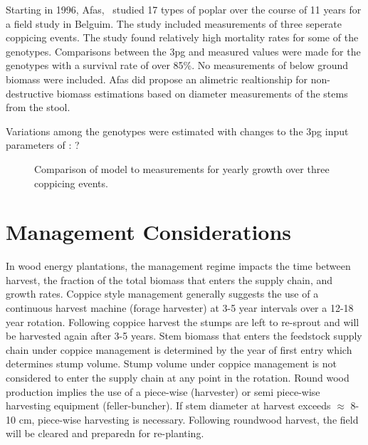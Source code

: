\documentclass[10pt]{article}
\begin{document}
Starting in 1996, Afas,~\cite{Afas2008a} studied 17 types of poplar
over the course of 11 years for a field study in Belguim.  The study
included measurements of three seperate coppicing events.  The study
found relatively high mortality rates for some of the genotypes.
Comparisons between the \ac{3pg} and measured values were made for the
genotypes with a survival rate of over 85\%.  No measurements of below
ground biomass were included.  Afas did propose an alimetric
realtionship for non-destructive biomass estimations based on diameter
measurements of the stems from the stool.

Variations among the genotypes were estimated with changes to the \ac{3pg}
input parameters of : ?

\begin{table}[!ht]
  \centering
    
  \caption{\ac{3pg} parameter variations of \ac{3pg} among genotypes}
  \label{tab:afas-3pg}
\end{table}

\begin{figure}[!ht]
  \centering

  \caption{Comparison of model to measurements for yearly growth over three
    coppicing events.}
\label{fig:afas-biomass}
\end{figure}

\section*{Management Considerations}
\label{sec:management-reg}

In wood energy plantations, the management regime impacts the time
between harvest, the fraction of the total biomass that enters the
supply chain, and growth rates. Coppice style management generally
suggests the use of a continuous harvest machine (forage harvester) at
3-5 year intervals over a 12-18 year rotation. Following coppice
harvest the stumps are left to re-sprout and will be harvested again
after 3-5 years.  Stem biomass that enters the feedstock supply chain
under coppice management is determined by the year of first entry
which determines stump volume.  Stump volume under coppice management
is not considered to enter the supply chain at any point in the
rotation. Round wood production implies the use of a piece-wise
(harvester) or semi piece-wise harvesting equipment
(feller-buncher). If stem diameter at harvest exceeds $\approx$ 8-10
cm, piece-wise harvesting is necessary. Following roundwood harvest,
the field will be cleared and preparedn for re-planting.
\end{document}
